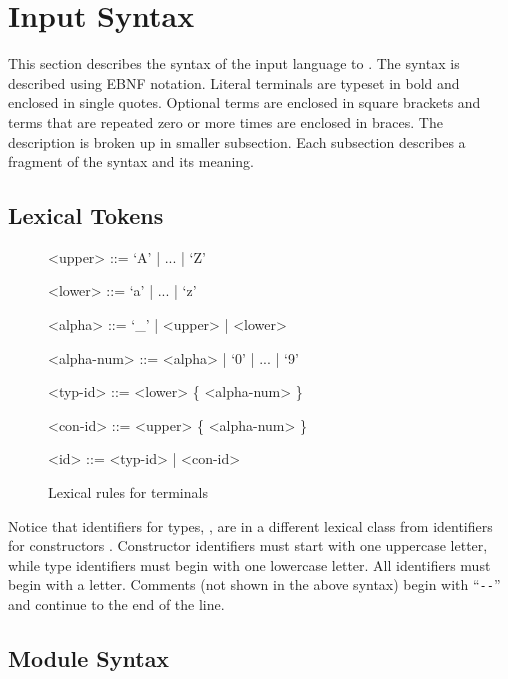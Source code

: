 %
\chapter{Input Syntax}
\label{chap:syntax}

This section describes the syntax of the input language to \asdlgen{}.
The syntax is described using EBNF notation.
Literal terminals are typeset in bold and enclosed in single quotes.
Optional terms are enclosed in square brackets and terms that are
repeated zero or more times are enclosed in braces.
The description is broken up in smaller subsection.
Each subsection describes a fragment of
the syntax and its meaning.

\section{Lexical Tokens}

\begin{figure}[t]
  \begin{center}
    \begin{grammar}
      <upper>     ::= `A' | ... | `Z'

      <lower>     ::= `a' | ... | `z'

      <alpha>     ::= `_' | <upper> | <lower>

      <alpha-num> ::= <alpha> | `0' | ... | `9'

      <typ-id>    ::= <lower> \{ <alpha-num> \}

      <con-id>    ::= <upper> \{ <alpha-num> \}

      <id>        ::= <typ-id> | <con-id>
    \end{grammar}
  \end{center}
  \caption{Lexical rules for \asdl{} terminals}
\end{figure}%

Notice that identifiers for types, , are in a different
lexical class from identifiers for constructors
. Constructor identifiers must start with one uppercase
letter, while type identifiers must begin with one lowercase
letter. All identifiers must begin with a letter.  Comments (not shown
in the above syntax) begin with ``\lstinline[language=ASDL]!--!''
and continue to the end of the line.

\section{Module Syntax}

